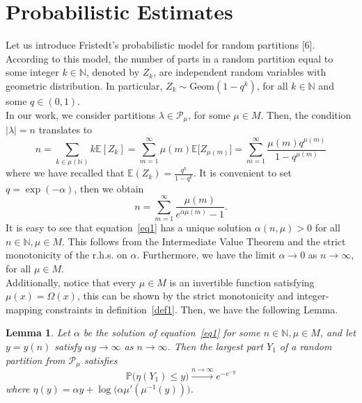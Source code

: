 \documentclass[pdflatex,sn-mathphys-num]{sn-jnl}%
\theoremstyle{thmstyleone}%
\theoremstyle{thmstyletwo}%
\theoremstyle{thmstylethree}%
\theoremstyle{thmstylethree}%
\newtheorem{lemma}{Lemma}%
\theoremstyle{thmstylethree}%
\begin{document}
\section{Probabilistic Estimates}
Let us introduce Fristedt's probabilistic model for random partitions [6]. According to this model, the number of parts in a random partition equal to some integer $k\in\mathbb{N}$, denoted by $Z_k$, are independent random variables with geometric distribution. In particular, $Z_k\sim\mathrm{Geom}(1-q^k)$, for all $k\in\mathbb{N}$ and some $q\in(0,1)$. \\
In our work, we consider partitions $\lambda\in\mathcal{P}_\mu$, for some $\mu\in M$. Then, the condition $|\lambda|=n$ translates to
\begin{equation*}
    n=\sum_{k\in\mu(\mathbb{N})}k\mathbb{E}[Z_k]=\sum_{m=1}^{\infty}\mu(m)\mathbb{E}\big[Z_{\mu(m)}\big]=\sum_{m=1}^\infty\frac{\mu(m)q^{\mu(m)}}{1-q^{\mu(m)}}
\end{equation*}
where we have recalled that $\mathbb{E}(Z_k)=\frac{q^k}{1-q^k}$. It is convenient to set $q=\exp(-\alpha)$, then we obtain
\begin{equation}\label{eq1}
    n=\displaystyle\sum_{m=1}^\infty\frac{\mu(m)}{e^{\alpha\mu(m)}-1}.
\end{equation}
It is easy to see that equation~\eqref{eq1} has a unique solution $\alpha(n,\mu)>0$ for all $n\in\mathbb{N}, \mu\in M$. This follows from the Intermediate Value Theorem and the strict monotonicity of the r.h.s. on $\alpha$. Furthermore, we have the limit $\alpha\to0$ as $n\to\infty$, for all $\mu\in M$. \\
Additionally, notice that every $\mu\in M$ is an invertible function satisfying $\mu(x)=\Omega(x)$, this can be shown by the strict monotonicity and integer-mapping constraints in definition~\ref{def1}. Then, we have the following Lemma.
\begin{lemma}\label{lemma1}
    Let $\alpha$ be the solution of equation~\eqref{eq1} for some $n\in\mathbb{N},\mu\in M$, and let $y=y(n)$ satisfy $\alpha y\to\infty$ as $n\to\infty$. Then the largest part $Y_1$ of a random partition from $\mathcal{P}_\mu$ satisfies
    \begin{equation}\label{eq2}
        \mathbb{P}\big(\eta(Y_1)\le y\big)\xrightarrow{n\to\infty}e^{-e^{-y}}
    \end{equation}
    where $\eta(y)=\alpha y + \log\big(\alpha\mu'(\mu^{-1}(y))\big)$.
\end{lemma}
\end{document}
